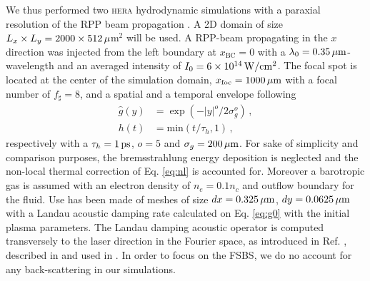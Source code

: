 \documentclass[
 reprint,
 amsmath,amssymb,
 aps,
]{revtex4-1}
\begin{document}
We thus performed two \textsc{hera} hydrodynamic simulations with a paraxial resolution of the RPP beam propagation \cite[]{Loiseau_2006}. 
A 2D domain of size $L_x \times L_y = 2000 \times 512\, \rm \mu$m$^2$ will be used. 
A RPP-beam  propagating in the $x$ direction was injected from the left boundary at $x_\mathrm{BC}=0$ with a  $\lambda_0=0.35\, \rm\mu m$-wavelength and an averaged intensity of $I_0=6\times 10^{14}\, \rm W/cm^2$.
The focal spot is located at the center of the simulation domain, $x_\mathrm{foc}=1000\, \rm \mu m$ with a focal number of $f_\sharp = 8$, and
{
a spatial and a temporal envelope following
\begin{align}
    \hat{g}(y) &= \exp(-\vert y\vert ^o/2\sigma_g^o)  \, ,  \label{eq:g}\\
    h(t) &= \mathrm{min}(t/\tau_h,1) \, ,\label{eq:h}
\end{align}
respectively with a $\tau_h=1\, \rm ps$,  $o=5$ and $\sigma_g = 200\,\rm \mu m$. }
For sake of simplicity and comparison purposes, the bremsstrahlung energy deposition is neglected and the non-local thermal correction of Eq. \eqref{eq:nl} is accounted for.  
Moreover a barotropic gas is assumed  with an electron density of $n_e =0.1n_c $ and outflow boundary for the fluid.
Use has been made of meshes of size $dx =0.325\,\rm \mu m$, $dy = 0.0625\, \rm \mu m$
with a Landau acoustic damping rate calculated on  Eq. \eqref{eq:g0} with the initial plasma parameters. 
The Landau damping acoustic operator is computed transversely to the laser direction in the Fourier space, as introduced in Ref. \cite[]{POP_Rose_96}, described in \cite[]{Berger_98} and used in   \cite{phd-PEML,Masson_2006,Huller_2008}.
In order to focus on the FSBS, we do no account for any back-scattering in our simulations. 
\end{document}
